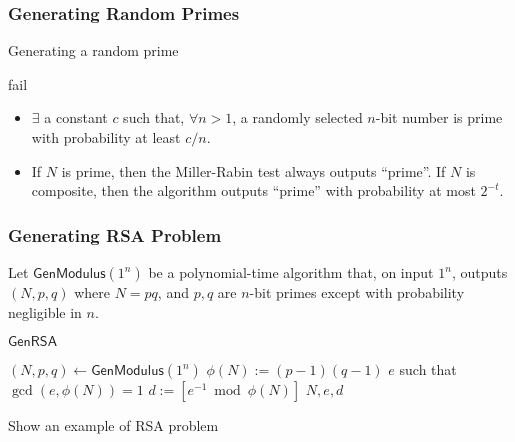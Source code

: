 \begin{comment}
Use extended Euclidean algorithm, $3\cdot 5-2\cdot 7 =1$.\\
$1_p = [(-2\cdot 7) \bmod 35]=21$ and $1_q = [3\cdot 5 \bmod 35] = 15$.\\
$(4,3) \leftrightarrow [4\cdot 1_p + 3\cdot 1_q \bmod 35] = 24$.
\end{exampleblock}
\begin{exampleblock}{Compute $[29^{100} \bmod 35]$}
$29 \leftrightarrow ([1 \bmod 5],[-1 \bmod 7])$, $[29^{100} \bmod 35] \leftrightarrow (1,-1)^{100} = (1,1) \leftrightarrow 1$.
\end{exampleblock}
\end{frame}
\end{comment}
\begin{frame}\frametitle{Generating Random Primes}
\begin{algorithm}[H]
\DontPrintSemicolon
\caption{Generating a random prime}
\BlankLine
{}
\Return fail
\end{algorithm}
\begin{itemize}
\item $\exists$ a constant $c$ such that, $\forall n>1$, a randomly selected $n$-bit number is prime with probability at least $c/n$.
\item If $N$ is prime, then the Miller-Rabin test always outputs ``prime''. If $N$ is composite, then the algorithm outputs ``prime'' with probability at most $2^{-t}$.
\end{itemize}
\end{frame}
\begin{frame}\frametitle{Generating RSA Problem}
Let $\mathsf{GenModulus}(1^n)$ be a polynomial-time algorithm that, on input $1^n$, outputs $(N,p,q)$ where $N=pq$, and $p,q$ are $n$-bit primes except with probability negligible in $n$.
\begin{algorithm}[H]
\DontPrintSemicolon
\caption{$\mathsf{GenRSA}$}
\BlankLine
$(N,p,q) \gets \mathsf{GenModulus}(1^n)$\;
$\phi(N) := (p-1)(q-1)$\;
\KwF $e$ such that $\gcd(e,\phi(N))=1$\;
\KwC $d := [e^{-1} \bmod \phi(N)]$\;
\Return $N,e,d$\;
\end{algorithm}
\begin{exampleblock}{Show an example of RSA problem}
\end{exampleblock}
\end{frame}
